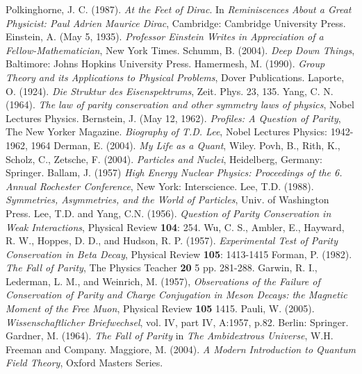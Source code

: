 \documentclass[12pt]{book}
\begin{document}
\begin{thebibliography}{widest-label}
      Polkinghorne, J. C. (1987). \emph{At the Feet of Dirac}. In \emph{Reminiscences About a Great Physicist: Paul Adrien Maurice Dirac}, Cambridge: Cambridge University Press.	
      Einstein, A. (May 5, 1935). \emph{Professor Einstein Writes in Appreciation of a Fellow-Mathematician}, New York Times.
      Schumm, B. (2004). \emph{Deep Down Things}, Baltimore: Johns Hopkins University Press.
      Hamermesh, M. (1990). \emph{Group Theory and its Applications to Physical Problems}, Dover Publications.
      Laporte, O. (1924). \emph{Die Struktur des Eisenspektrums}, Zeit. Phys. 23, 135.
      Yang, C. N. (1964). \emph{The law of parity conservation and other symmetry laws of physics}, Nobel Lectures Physics.
      Bernstein, J. (May 12, 1962). \emph{Profiles: A Question of Parity}, The New Yorker Magazine.
      \emph{Biography of T.D. Lee}, Nobel Lectures Physics: 1942-1962, 1964
      Derman, E. (2004). \emph{My Life as a Quant}, Wiley.
      Povh, B., Rith, K., Scholz, C., Zetsche, F. (2004). \emph{Particles and Nuclei}, Heidelberg, Germany: Springer. 
      Ballam, J. (1957) \emph{High Energy Nuclear Physics: Proceedings of the 6. Annual Rochester Conference}, New York: Interscience.
      Lee, T.D. (1988). \emph{Symmetries, Asymmetries, and the World of Particles}, Univ. of
Washington Press.
      Lee, T.D. and Yang, C.N. (1956). \emph{Question of Parity Conservation in Weak Interactions}, Physical Review \textbf{104}: 254.
      Wu, C. S., Ambler, E., Hayward, R. W., Hoppes, D. D., and Hudson, R. P. (1957). \emph{Experimental Test of Parity Conservation in Beta Decay}, Physical Review \textbf{105}: 1413-1415
      Forman, P. (1982). \emph{The Fall of Parity}, The Physics Teacher \textbf{20} 5 pp. 281-288.
      Garwin, R. I., Lederman, L. M., and Weinrich, M. (1957), \emph{Observations of the Failure of Conservation of Parity and Charge Conjugation in Meson Decays: the Magnetic Moment of the Free Muon}, Physical Review \textbf{105} 1415.
      Pauli, W. (2005). \emph{Wissenschaftlicher Briefwechsel}, vol. IV, part IV, A:1957, p.82. Berlin: Springer.
      Gardner, M. (1964). \emph{The Fall of Parity} in \emph{The Ambidextrous Universe}, W.H. Freeman and Company.
      Maggiore, M. (2004). \emph{A Modern Introduction to Quantum Field Theory}, Oxford Masters Series.

\end{thebibliography}
\end{document}
